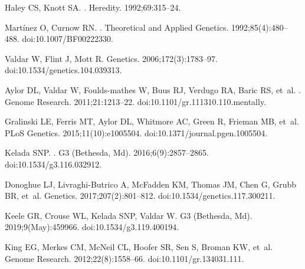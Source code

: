 \documentclass[10pt,letterpaper]{article}
\begin{document}
\begin{thebibliography}{10}
Haley CS, Knott SA.
.
\newblock Heredity. 1992;69:315--24.

Mart{\'{i}}nez O, Curnow RN.
.
\newblock Theoretical and Applied Genetics. 1992;85(4):480--488.
\newblock doi:{10.1007/BF00222330}.

Valdar W, Flint J, Mott R.
\newblock Genetics. 2006;172(3):1783--97.
\newblock doi:{10.1534/genetics.104.039313}.

Aylor DL, Valdar W, Foulds-mathes W, Buus RJ, Verdugo RA, Baric RS, et~al.
.
\newblock Genome Research. 2011;21:1213--22.
\newblock doi:{10.1101/gr.111310.110.mentally}.

Gralinski LE, Ferris MT, Aylor DL, Whitmore AC, Green R, Frieman MB, et~al.
\newblock PLoS Genetics. 2015;11(10):e1005504.
\newblock doi:{10.1371/journal.pgen.1005504}.

Kelada SNP.
.
\newblock G3 (Bethesda, Md). 2016;6(9):2857--2865.
\newblock doi:{10.1534/g3.116.032912}.

Donoghue LJ, Livraghi-Butrico A, McFadden KM, Thomas JM, Chen G, Grubb BR,
  et~al.
\newblock Genetics. 2017;207(2):801--812.
\newblock doi:{10.1534/genetics.117.300211}.

Keele GR, Crouse WL, Kelada SNP, Valdar W.
\newblock G3 (Bethesda, Md). 2019;9(May):459966.
\newblock doi:{10.1534/g3.119.400194}.

King EG, Merkes CM, McNeil CL, Hoofer SR, Sen S, Broman KW, et~al.
\newblock Genome Research. 2012;22(8):1558--66.
\newblock doi:{10.1101/gr.134031.111}.


\end{thebibliography}
\end{document}
